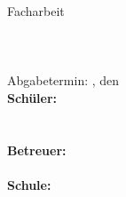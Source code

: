 \begin{titlepage}

\begin{center}
\Large{Facharbeit \pruefungstermin}\\[3ex]

\LARGE{\betreff}\\[10ex]

\huge{\textbf{\titel}}\\[2ex]
\Large{\textbf{\untertitel}}\\[8ex]

\normalsize
Abgabetermin: \abgabeOrt, den \abgabeTermin\\[5em]
\textbf{Schüler:}\\
\autorName\\
\autorAnschrift\\[4em]

\textbf{Betreuer:}\\
\betreuerName\\[6em]

\textbf{Schule:}\\
\betriebName\\
\betriebAnschrift\\
\betriebOrt\\[5em]
\end{center}

\end{titlepage}